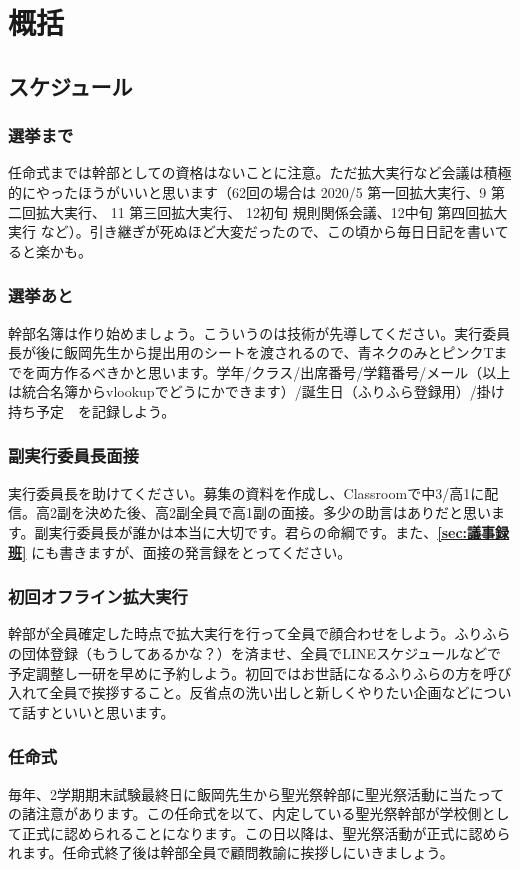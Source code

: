 \documentclass[dvipdfmx,jb5]{jarticle}
\begin{document}
\section{概括}
\subsection{スケジュール}
\subsubsection{選挙まで}
任命式までは幹部としての資格はないことに注意。ただ拡大実行など会議は積極的にやったほうがいいと思います（62回の場合は 2020/5 第一回拡大実行、9 第二回拡大実行、 11 第三回拡大実行、 12初旬 規則関係会議、12中旬 第四回拡大実行 など）。引き継ぎが死ぬほど大変だったので、この頃から毎日日記を書いてると楽かも。

\subsubsection{選挙あと}
幹部名簿は作り始めましょう。こういうのは技術が先導してください。実行委員長が後に飯岡先生から提出用のシートを渡されるので、青ネクのみとピンクTまでを両方作るべきかと思います。学年/クラス/出席番号/学籍番号/メール（以上は統合名簿からvlookupでどうにかできます）/誕生日（ふりふら登録用）/掛け持ち予定　を記録しよう。

\subsubsection{副実行委員長面接}
実行委員長を助けてください。募集の資料を作成し、Classroomで中3/高1に配信。高2副を決めた後、高2副全員で高1副の面接。多少の助言はありだと思います。副実行委員長が誰かは本当に大切です。君らの命綱です。また、{\bf \ref{sec:議事録班}} にも書きますが、面接の発言録をとってください。

\subsubsection{初回オフライン拡大実行}
幹部が全員確定した時点で拡大実行を行って全員で顔合わせをしよう。ふりふらの団体登録（もうしてあるかな？）を済ませ、全員でLINEスケジュールなどで予定調整し一研を早めに予約しよう。初回ではお世話になるふりふらの方を呼び入れて全員で挨拶すること。反省点の洗い出しと新しくやりたい企画などについて話すといいと思います。

\subsubsection{任命式}
毎年、2学期期末試験最終日に飯岡先生から聖光祭幹部に聖光祭活動に当たっての諸注意があります。この任命式を以て、内定している聖光祭幹部が学校側として正式に認められることになります。この日以降は、聖光祭活動が正式に認められます。任命式終了後は幹部全員で顧問教諭に挨拶しにいきましょう。
\end{document}
